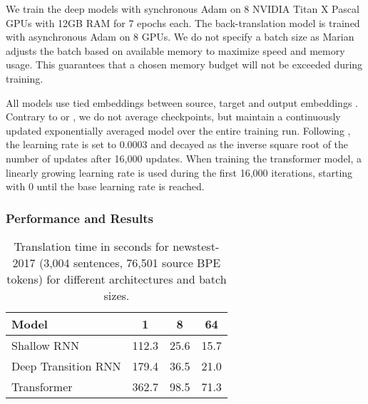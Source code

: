 \documentclass[11pt,a4paper]{article}
\begin{document}
  We train the deep models with synchronous Adam on 8 NVIDIA Titan X Pascal GPUs with 12GB RAM for 7 epochs each. The back-translation model is trained with asynchronous Adam on 8 GPUs. We do not specify a batch size as Marian adjusts the batch based on available memory to maximize speed and memory usage.  This guarantees that a chosen memory budget will not be exceeded during training.

  All models use tied embeddings between source, target and output embeddings \cite{press2017using}. Contrary to  or , we do not average checkpoints, but maintain a continuously updated exponentially averaged model over the entire training run. Following , the learning rate is set to 0.0003 and decayed as the inverse square root of the number of updates after 16,000 updates. When training the transformer model, a linearly growing learning rate is used during the first 16,000 iterations, starting with 0 until the base learning rate is reached. 

  \subsubsection{Performance and Results}

  \begin{table}[t]
  \centering
  \begin{tabular}{lccc}\toprule
  Model & 1 & 8 & 64 \\ \midrule
  Shallow RNN & 112.3 & 25.6 & 15.7\\
  Deep Transition RNN & 179.4 & 36.5 & 21.0\\
  Transformer & 362.7 & 98.5 & 71.3\\ \bottomrule
  \end{tabular}
  \caption{Translation time in seconds for newstest-2017 (3,004 sentences, 76,501 source BPE tokens) for different architectures and batch sizes.}
  \label{tab-trans}
  \end{table}



\end{document}
